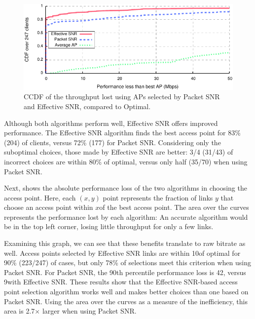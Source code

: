 \begin{figure}[t]
	\centering
	\includegraphics[width=\textwidth]{figures/applications/ap_sel_diff_opt.pdf}
	\caption[Throughput difference using APs selected by Packet SNR or Effective SNR]{\label{fig:ap_sel_delta_opt}CCDF of the throughput lost using APs selected by Packet SNR and Effective SNR, compared to Optimal.}
\end{figure}

Although both algorithms perform well, Effective SNR offers improved performance. The Effective SNR algorithm finds the best access point for 83\% (204) of clients, versus 72\% (177) for Packet SNR. Considering only the suboptimal choices, those made by Effective SNR are better: 3/4 (31/43) of incorrect choices are within 80\% of optimal, versus only half (35/70) when using Packet SNR.

Next,  shows the absolute performance loss of the two algorithms in choosing the access point. Here, each $(x,y)$ point represents the fraction of links $y$ that choose an access point within $x$\Mbps of the best access point. The area over the curves represents the performance lost by each algorithm: An accurate algorithm would be in the top left corner, losing little throughput for only a few links.

Examining this graph, we can see that these benefits translate to raw bitrate as well. Access points selected by Effective SNR links are within 10\Mbps of optimal for 90\% (223/247) of cases, but only 78\% of selections meet this criterion when using Packet SNR. For Packet SNR, the 90th percentile performance loss is 42\Mbps, versus 9\Mbps with Effective SNR. These results show that the Effective SNR-based access point selection algorithm works well and makes better choices than one based on Packet SNR. Using the area over the curves as a measure of the inefficiency, this area is 2.7$\times$ larger when using Packet SNR.

